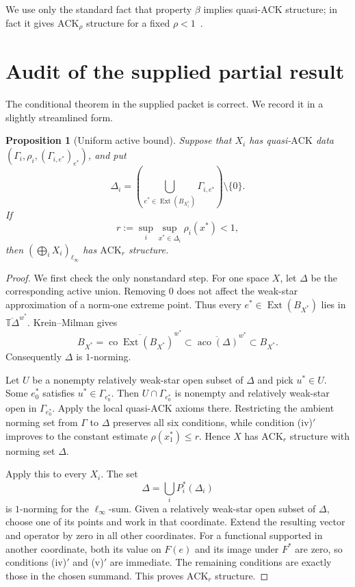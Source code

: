 \documentclass[11pt]{article}
\newtheorem{proposition}[theorem]{Proposition}
\theoremstyle{definition}
\newcommand{\T}{\mathbb T}
\newcommand{\Ext}{\operatorname{Ext}}
\newcommand{\aco}{\operatorname{aco}}
\newcommand{\ACK}{\mathrm{ACK}}
\begin{document}
We use only the standard fact that property $\beta$ implies quasi-$\ACK$
structure; in fact it gives $\ACK_\rho$ structure for a fixed
$\rho<1$~\cite{CascalesEtAl,ChoiJung}.

\section{Audit of the supplied partial result}

The conditional theorem in the supplied packet is correct.  We record it in
a slightly streamlined form.

\begin{proposition}[Uniform active bound]\label{prop:uniform}
Suppose that $X_i$ has quasi-$\ACK$ data
$(\Gamma_i,\rho_i,(\Gamma_{i,e^*})_{e^*})$, and put
\[
 \Delta_i=
 \left(\bigcup_{e^*\in\Ext(B_{X_i^*})}\Gamma_{i,e^*}\right)\setminus\{0\}.
\]
If
\[
  r:=\sup_i\sup_{x^*\in\Delta_i}\rho_i(x^*)<1,
\]
then $(\bigoplus_iX_i)_{\ell_\infty}$ has $\ACK_r$ structure.
\end{proposition}

\begin{proof}
We first check the only nonstandard step.  For one space $X$, let
$\Delta$ be the corresponding active union.  Removing $0$ does not affect
the weak-star approximation of a norm-one extreme point.  Thus every
$e^*\in\Ext(B_{X^*})$ lies in
$\overline{\T\Delta}^{w^*}$.  Krein--Milman gives
\[
 B_{X^*}
 =\overline{\operatorname{co}\Ext(B_{X^*})}^{w^*}
 \subset \overline{\aco(\Delta)}^{w^*}\subset B_{X^*}.
\]
Consequently $\Delta$ is $1$-norming.

Let $U$ be a nonempty relatively weak-star open subset of $\Delta$ and pick
$u^*\in U$.  Some $e_0^*$ satisfies
$u^*\in\Gamma_{e_0^*}$.  Then
$U\cap\Gamma_{e_0^*}$ is nonempty and relatively weak-star open in
$\Gamma_{e_0^*}$.  Apply the local quasi-$\ACK$ axioms there.  Restricting
the ambient norming set from $\Gamma$ to $\Delta$ preserves all six
conditions, while condition (iv)$'$ improves to the constant estimate
$\rho(x_1^*)\le r$.  Hence $X$ has $\ACK_r$ structure with norming set
$\Delta$.

Apply this to every $X_i$.  The set
\[
  \Delta=\bigcup_i P_i^*(\Delta_i)
\]
is $1$-norming for the $\ell_\infty$-sum.  Given a relatively weak-star
open subset of $\Delta$, choose one of its points and work in that coordinate.
Extend the resulting vector and operator by zero in all other coordinates.
For a functional supported in another coordinate, both its value on $F(e)$
and its image under $F^*$ are zero, so conditions (iv)$'$ and (v)$'$ are
immediate.  The remaining conditions are exactly those in the chosen
summand.  This proves $\ACK_r$ structure.
\end{proof}
\end{document}
